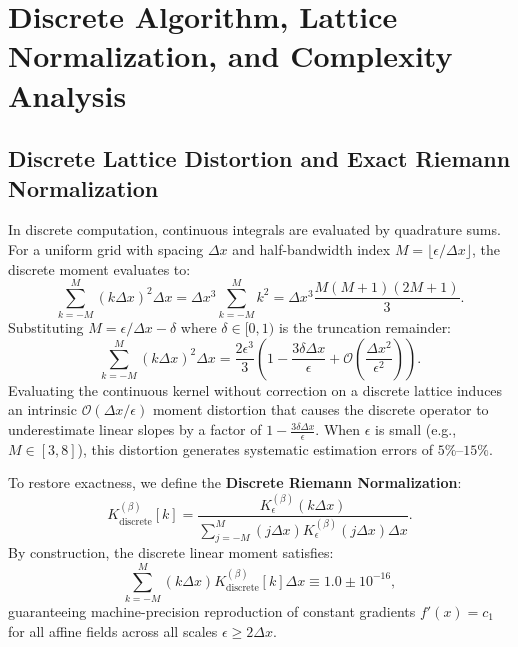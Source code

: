\documentclass[11pt,a4paper]{article}
\theoremstyle{definition}
\begin{document}
\section{Discrete Algorithm, Lattice Normalization, and Complexity Analysis}
\label{sec:algorithm}

\subsection{Discrete Lattice Distortion and Exact Riemann Normalization}
\label{sec:discrete_distortion}
In discrete computation, continuous integrals are evaluated by quadrature sums. For a uniform grid with spacing $\Delta x$ and half-bandwidth index $M = \lfloor \epsilon / \Delta x \rfloor$, the discrete moment evaluates to:
\begin{equation}
\sum_{k=-M}^M (k \Delta x)^2 \Delta x = \Delta x^3 \sum_{k=-M}^M k^2 = \Delta x^3 \frac{M(M+1)(2M+1)}{3}.
\end{equation}
Substituting $M = \epsilon / \Delta x - \delta$ where $\delta \in [0, 1)$ is the truncation remainder:
\begin{equation}
\sum_{k=-M}^M (k \Delta x)^2 \Delta x = \frac{2\epsilon^3}{3} \left( 1 - \frac{3\delta \Delta x}{\epsilon} + \mathcal{O}\left( \frac{\Delta x^2}{\epsilon^2} \right) \right).
\end{equation}
Evaluating the continuous kernel without correction on a discrete lattice induces an intrinsic $\mathcal{O}(\Delta x / \epsilon)$ moment distortion that causes the discrete operator to underestimate linear slopes by a factor of $1 - \frac{3\delta \Delta x}{\epsilon}$. When $\epsilon$ is small (e.g., $M \in [3, 8]$), this distortion generates systematic estimation errors of $5\%$--$15\%$.

To restore exactness, we define the \textbf{Discrete Riemann Normalization}:
\begin{equation}
K_{\text{discrete}}^{(\beta)}[k] = \frac{K_\epsilon^{(\beta)}(k \Delta x)}{\sum_{j=-M}^M (j \Delta x) K_\epsilon^{(\beta)}(j \Delta x) \Delta x}.
\label{eq:discrete_normalization}
\end{equation}
By construction, the discrete linear moment satisfies:
\begin{equation}
\sum_{k=-M}^M (k \Delta x) K_{\text{discrete}}^{(\beta)}[k] \Delta x \equiv 1.0 \pm 10^{-16},
\end{equation}
guaranteeing machine-precision reproduction of constant gradients $f'(x) = c_1$ for all affine fields across all scales $\epsilon \ge 2\Delta x$.
\end{document}
